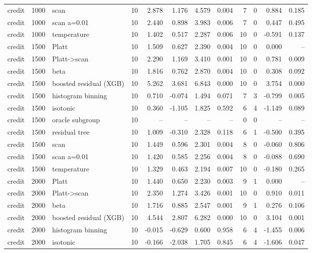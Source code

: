 \begin{tabular}{lllrrrrrrrrr}
credit & 1000 & scan & 10 & 2.878 & 1.176 & 4.579 & 0.004 & 7 & 0 & 0.884 & 0.185 \\
credit & 1000 & scan a=0.01 & 10 & 2.440 & 0.898 & 3.983 & 0.006 & 7 & 0 & 0.447 & 0.495 \\
credit & 1000 & temperature & 10 & 1.402 & 0.517 & 2.287 & 0.006 & 10 & 0 & -0.591 & 0.137 \\
credit & 1500 & Platt & 10 & 1.509 & 0.627 & 2.390 & 0.004 & 10 & 0 & 0.000 & -- \\
credit & 1500 & Platt->scan & 10 & 2.290 & 1.169 & 3.410 & 0.001 & 10 & 0 & 0.781 & 0.009 \\
credit & 1500 & beta & 10 & 1.816 & 0.762 & 2.870 & 0.004 & 10 & 0 & 0.308 & 0.092 \\
credit & 1500 & boosted residual (XGB) & 10 & 5.262 & 3.681 & 6.843 & 0.000 & 10 & 0 & 3.754 & 0.000 \\
credit & 1500 & histogram binning & 10 & 0.710 & -0.074 & 1.494 & 0.071 & 7 & 3 & -0.799 & 0.005 \\
credit & 1500 & isotonic & 10 & 0.360 & -1.105 & 1.825 & 0.592 & 6 & 4 & -1.149 & 0.089 \\
credit & 1500 & oracle subgroup & 10 & -- & -- & -- & -- & 0 & 0 & -- & -- \\
credit & 1500 & residual tree & 10 & 1.009 & -0.310 & 2.328 & 0.118 & 6 & 1 & -0.500 & 0.395 \\
credit & 1500 & scan & 10 & 1.449 & 0.596 & 2.301 & 0.004 & 8 & 0 & -0.060 & 0.806 \\
credit & 1500 & scan a=0.01 & 10 & 1.420 & 0.585 & 2.256 & 0.004 & 8 & 0 & -0.088 & 0.690 \\
credit & 1500 & temperature & 10 & 1.329 & 0.463 & 2.194 & 0.007 & 10 & 0 & -0.180 & 0.265 \\
credit & 2000 & Platt & 10 & 1.440 & 0.650 & 2.230 & 0.003 & 9 & 1 & 0.000 & -- \\
credit & 2000 & Platt->scan & 10 & 2.350 & 1.274 & 3.426 & 0.001 & 10 & 0 & 0.910 & 0.011 \\
credit & 2000 & beta & 10 & 1.716 & 0.885 & 2.547 & 0.001 & 9 & 1 & 0.276 & 0.106 \\
credit & 2000 & boosted residual (XGB) & 10 & 4.544 & 2.807 & 6.282 & 0.000 & 10 & 0 & 3.104 & 0.001 \\
credit & 2000 & histogram binning & 10 & -0.015 & -0.629 & 0.600 & 0.958 & 6 & 4 & -1.455 & 0.006 \\
credit & 2000 & isotonic & 10 & -0.166 & -2.038 & 1.705 & 0.845 & 6 & 4 & -1.606 & 0.047 \\

\end{tabular}
